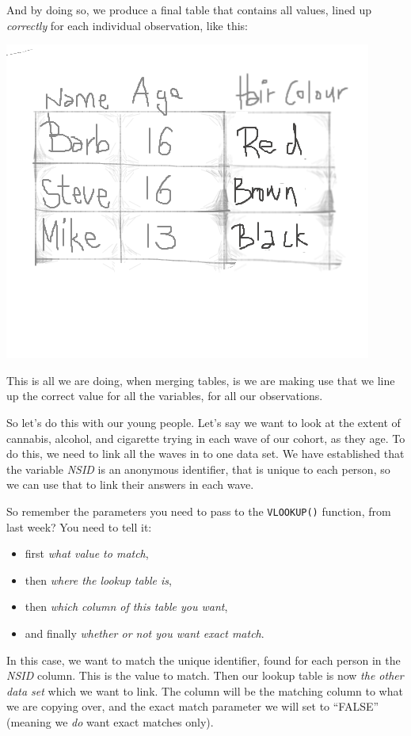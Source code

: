 \documentclass[]{book}
\providecommand{\tightlist}{%
  \setlength{\itemsep}{0pt}\setlength{\parskip}{0pt}}
\theoremstyle{definition}
\theoremstyle{definition}
\theoremstyle{definition}
\theoremstyle{remark}
\begin{document}
And by doing so, we produce a final table that contains all values,
lined up \emph{correctly} for each individual observation, like this:

\includegraphics{imgs/merge_logic_2.png}

This is all we are doing, when merging tables, is we are making use that
we line up the correct value for all the variables, for all our
observations.

So let's do this with our young people. Let's say we want to look at the
extent of cannabis, alcohol, and cigarette trying in each wave of our
cohort, as they age. To do this, we need to link all the waves in to one
data set. We have established that the variable \emph{NSID} is an
anonymous identifier, that is unique to each person, so we can use that
to link their answers in each wave.

So remember the parameters you need to pass to the \texttt{VLOOKUP()}
function, from last week? You need to tell it:

\begin{itemize}
\tightlist
\item
  first \emph{what value to match},
\item
  then \emph{where the lookup table is},
\item
  then \emph{which column of this table you want},
\item
  and finally \emph{whether or not you want exact match}.
\end{itemize}

In this case, we want to match the unique identifier, found for each
person in the \emph{NSID} column. This is the value to match. Then our
lookup table is now \emph{the other data set} which we want to link. The
column will be the matching column to what we are copying over, and the
exact match parameter we will set to ``FALSE'' (meaning we \emph{do}
want exact matches only).
\end{document}

